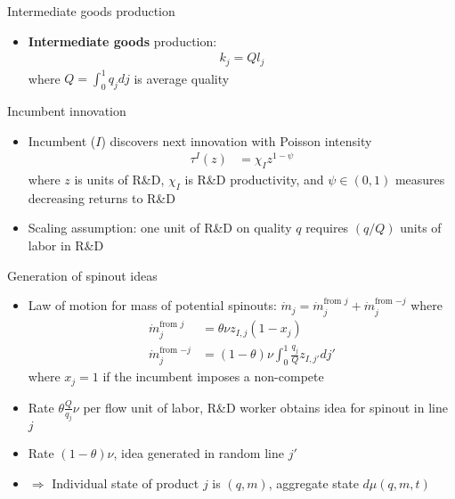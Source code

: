 \documentclass[english,usenames,dvipsnames]{beamer}
\begin{document}
\begin{frame}{Intermediate goods production}
\begin{itemize}
	\item \textbf{Intermediate goods }production:
	\begin{align*}
	k_j = Q l_j
	\end{align*}
	where $Q = \int_0^1 q_j dj$ is average quality
\end{itemize}
\end{frame}

\begin{frame}{Incumbent innovation}
\begin{itemize}
\item Incumbent ($I$) discovers next innovation with Poisson intensity
\begin{align*}
\tau^I(z) &= \chi_I z^{1-\psi}
\end{align*}
where $z$ is units of R\&D, $\chi_I$ is R\&D productivity, and $\psi \in (0,1)$ measures decreasing returns to R\&D 
\item Scaling assumption: one unit of R\&D on quality $q$ requires $(q/Q)$ units of labor in R\&D
\end{itemize}
\end{frame}

\begin{frame}{Generation of spinout ideas}
\begin{itemize}
	\item Law of motion for mass of potential spinouts: $\dot{m}_j = \dot{m}_j^{\textrm{from $j$}} + \dot{m}_j^{\textrm{from $-j$}}$ where
	\begin{align*}
	\dot{m}_j^{\textrm{from $j$}}&= \theta \nu z_{I,j} (1-x_j)\\
	\dot{m}_j^{\textrm{from $-j$}} &= (1-\theta)\nu \int_0^1 \frac{q_j}{Q} z_{I,j'} dj'
	\end{align*}
	where $x_j = 1$ if the incumbent imposes a non-compete
	\item Rate $\theta \frac{Q}{q_j} \nu$ per flow unit of labor, R\&D worker obtains idea for spinout in line $j$
	\item Rate $(1-\theta) \nu$, idea generated in random line $j'$
	\item $\Rightarrow$ Individual state of product $j$ is $(q,m)$, aggregate state $d\mu(q,m,t)$
\end{itemize}
\end{frame}
\end{document}
